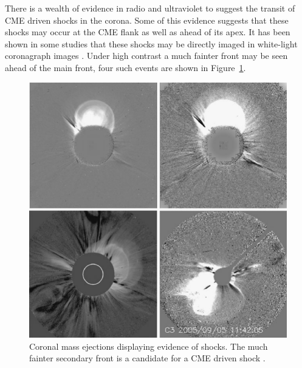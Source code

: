 There is a wealth of evidence in radio and ultraviolet to suggest the transit of CME driven shocks in the corona. Some of this evidence suggests that these shocks may occur at the CME flank as well as ahead of its apex. It has been shown in some studies that these shocks may be directly imaged in white-light coronagraph images \citep{vourlidas2012, vourlidas2013}. Under high contrast a much fainter front may be seen ahead of the main front, four such events are shown in Figure~\ref{fig:wl_shock}. 
\begin{figure}[!t]
\begin{center}
\includegraphics[scale=0.9, trim=0cm 0cm 0cm 0.5cm]{images/wl_shock.pdf}
\caption[White-light image of shocks]{Coronal mass ejections displaying evidence of shocks. The much fainter secondary front is a candidate for a CME driven shock \citep{vourlidas2013}.}
\label{fig:wl_shock}
\end{center}
\end{figure}
